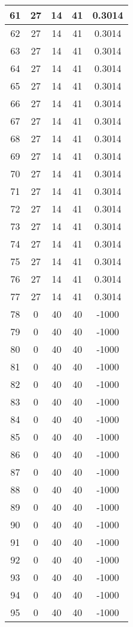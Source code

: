 \documentclass[letterpaper, 12pt]{article}
\begin{document}
\begin{longtable}{|c|c|c|c|c|}
\hline
61 & 27 & 14 & 41 & 0.3014 \\
\hline
62 & 27 & 14 & 41 & 0.3014 \\
\hline
63 & 27 & 14 & 41 & 0.3014 \\
\hline
64 & 27 & 14 & 41 & 0.3014 \\
\hline
65 & 27 & 14 & 41 & 0.3014 \\
\hline
66 & 27 & 14 & 41 & 0.3014 \\
\hline
67 & 27 & 14 & 41 & 0.3014 \\
\hline
68 & 27 & 14 & 41 & 0.3014 \\
\hline
69 & 27 & 14 & 41 & 0.3014 \\
\hline
70 & 27 & 14 & 41 & 0.3014 \\
\hline
71 & 27 & 14 & 41 & 0.3014 \\
\hline
72 & 27 & 14 & 41 & 0.3014 \\
\hline
73 & 27 & 14 & 41 & 0.3014 \\
\hline
74 & 27 & 14 & 41 & 0.3014 \\
\hline
75 & 27 & 14 & 41 & 0.3014 \\
\hline
76 & 27 & 14 & 41 & 0.3014 \\
\hline
77 & 27 & 14 & 41 & 0.3014 \\
\hline
78 & 0 & 40 & 40 & -1000 \\
\hline
79 & 0 & 40 & 40 & -1000 \\
\hline
80 & 0 & 40 & 40 & -1000 \\
\hline
81 & 0 & 40 & 40 & -1000 \\
\hline
82 & 0 & 40 & 40 & -1000 \\
\hline
83 & 0 & 40 & 40 & -1000 \\
\hline
84 & 0 & 40 & 40 & -1000 \\
\hline
85 & 0 & 40 & 40 & -1000 \\
\hline
86 & 0 & 40 & 40 & -1000 \\
\hline
87 & 0 & 40 & 40 & -1000 \\
\hline
88 & 0 & 40 & 40 & -1000 \\
\hline
89 & 0 & 40 & 40 & -1000 \\
\hline
90 & 0 & 40 & 40 & -1000 \\
\hline
91 & 0 & 40 & 40 & -1000 \\
\hline
92 & 0 & 40 & 40 & -1000 \\
\hline
93 & 0 & 40 & 40 & -1000 \\
\hline
94 & 0 & 40 & 40 & -1000 \\
\hline
95 & 0 & 40 & 40 & -1000 \\

\end{longtable}
\end{document}
